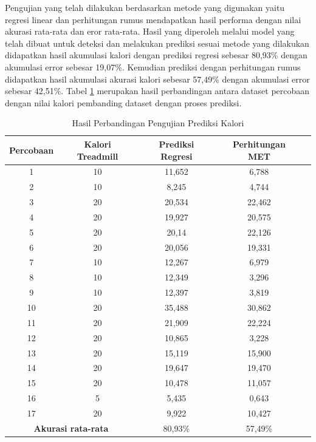 Pengujian yang telah dilakukan berdasarkan metode yang digunakan yaitu regresi linear dan perhitungan rumus mendapatkan hasil performa dengan nilai akurasi rata-rata dan eror rata-rata. Hasil yang diperoleh melalui model yang telah dibuat untuk deteksi dan melakukan prediksi sesuai metode yang dilakukan didapatkan hasil akumulasi kalori dengan prediksi regresi sebesar 80,93\% dengan akumulasi error sebesar 19,07\%. Kemudian prediksi dengan perhitungan rumus didapatkan hasil akumulasi akurasi kalori sebesar 57,49\% dengan akumulasi error sebesar 42,51\%. Tabel \ref{tb:PengujianPrediksi} merupakan hasil perbandingan antara dataset percobaan dengan nilai kalori pembanding dataset dengan proses prediksi.

\begin{longtable}{|c|c|c|c|c|}
  \caption{Hasil Perbandingan Pengujian Prediksi Kalori}
  \label{tb:PengujianPrediksi}                                   \\
  \hline
  \rowcolor[HTML]{C0C0C0}
  \textbf{Percobaan} & \textbf{Kalori Treadmill} & \textbf{Prediksi Regresi} & \textbf{Perhitungan MET} \\
  \hline
  1   & 10    & 11,652    & 6,788   \\
  \hline
  2   & 10    & 8,245     & 4,744   \\
  \hline
  3   & 20    & 20,534    & 22,462   \\
  \hline
  4   & 20    & 19,927    & 20,575   \\
  \hline
  5   & 20    & 20,14     & 22,126   \\
  \hline
  6   & 20    & 20,056    & 19,331   \\
  \hline
  7   & 10    & 12,267    & 6,979  \\
  \hline
  8   & 10    & 12,349    & 3,296  \\
  \hline
  9   & 10    & 12,397    & 3,819  \\
  \hline
  10   & 20   & 35,488    & 30,862  \\
  \hline
  11   & 20   & 21,909    & 22,224  \\
  \hline
  12   & 20   & 10,865    & 3,228  \\
  \hline
  13   & 20   & 15,119    & 15,900  \\
  \hline
  14   & 20   & 19,647    & 19,470  \\
  \hline
  15   & 20   & 10,478    & 11,057  \\
  \hline
  16   & 5    & 5,435     & 0,643  \\
  \hline
  17   & 20   & 9,922     & 10,427  \\
  \hline

  \multicolumn{2}{|c|}{\textbf{Akurasi rata-rata}} & 80,93\% & 57,49\% \\
  \hline
\end{longtable}


